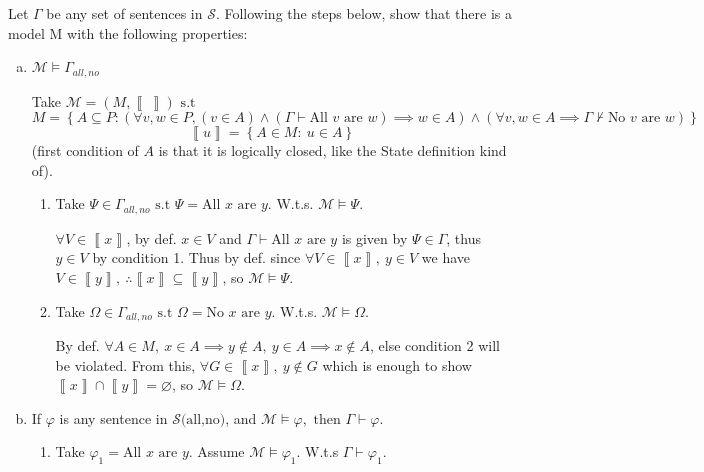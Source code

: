 
Let $\Gamma $ be any set of sentences in $\mathscr{S}$. Following the steps below, show that there is a
model M with the following properties:
\begin{enumerate}[(a)]
\item
	$\mathcal{M} \vDash  \Gamma_{all,no}$

		Take $\mathcal{M} = \left(  M, \left\llbracket  \  \right\rrbracket  \right) \text{ s.t }$ 		$$M= \left\{  A \subseteq P: (\forall v,w \in  P, (v \in  A) \land (\Gamma \vdash  \text{All } v \text{ are } w ) \implies  w \in  A)\land(\forall v,w \in  A \implies  \Gamma \nvdash  \text{No } v \text{ are } w ) \right\}$$
		 $$\left\llbracket  u  \right\rrbracket =\left\{  A \in  M:\  u \in  A \right\}$$
		 (first condition of $A$ is that it is logically closed, like the State definition kind of).
\begin{enumerate}[1.]
	\item
Take $\Psi \in  \Gamma_{all,no} \text{ s.t }  \Psi = \text{All } x \text{ are } y.$ W.t.s. $\mathcal{M} \vDash  \Psi$.

 $\forall V \in  \left\llbracket  x  \right\rrbracket$, by def. $x \in  V$ and $\Gamma \vdash  \text{All } x \text{ are } y$ is given by $\Psi \in  \Gamma $, thus $y \in V $ by condition 1. Thus by def. since $\forall V \in  \left\llbracket  x  \right\rrbracket,\ y \in  V$ we have $V \in  \left\llbracket  y  \right\rrbracket,\ \therefore  \left\llbracket  x  \right\rrbracket \subseteq \left\llbracket  y  \right\rrbracket $, so $\mathcal{M} \vDash  \Psi$.
 \item
Take $\Omega \in  \Gamma_{all,no} \text{ s.t }  \Omega = \text{No } x \text{ are } y$. W.t.s. $\mathcal{M} \vDash  \Omega $.

By def. $\forall A \in  M,\ x \in  A \implies  y \not\in  A,\ y \in  A \implies  x \not\in  A$, else condition 2 will be violated. From this, $\forall G \in  \left\llbracket  x  \right\rrbracket,\ y \not\in  G$ which is enough to show $\left\llbracket  x  \right\rrbracket \cap \left\llbracket  y  \right\rrbracket = \varnothing $, so $\mathcal{M} \vDash  \Omega $.
\end{enumerate}
\item
	If $\varphi $ is any sentence in $\mathscr{S}\text{(all,no)}$, and $\mathcal{M} \vDash  \varphi,\text{ then }\Gamma \vdash  \varphi $.
\begin{enumerate}[1.]
	\item
		Take $\varphi_1 = \text{All } x \text{ are } y$. Assume $  \mathcal{M} \vDash  \varphi_1  $. W.t.s $\Gamma \vdash  \varphi_1 $.


\end{enumerate}
\end{enumerate}
